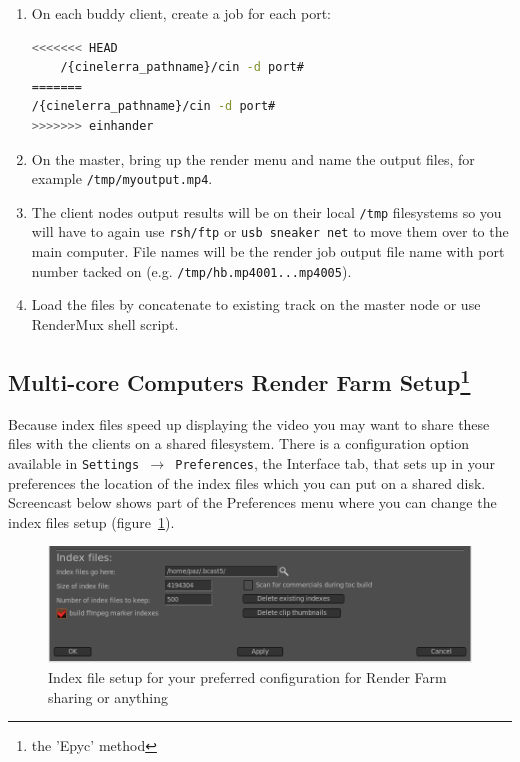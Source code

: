 \begin{enumerate}
    \item On each buddy client, create a job for each port:    
    \begin{lstlisting}[language=bash]
<<<<<<< HEAD
    /{cinelerra_pathname}/cin -d port#
=======
/{cinelerra_pathname}/cin -d port#
>>>>>>> einhander
    \end{lstlisting}
    \item On the master, bring up the render menu and name the output files, for example \texttt{/tmp/myoutput.mp4}.
    \item The client nodes output results will be on their local \texttt{/tmp} filesystems so you will have to again use
    \texttt{rsh/ftp} or \texttt{usb sneaker net} to move them over to the main computer.  File names will be the render
    job output file name with port number tacked on (e.g. \texttt{/tmp/hb.mp4001...mp4005}).
    \item Load the files by concatenate to existing track on the master node or use RenderMux shell script.
\end{enumerate}

\subsection{Multi-core Computers Render Farm Setup\protect\footnote{the 'Epyc' method}}%
\label{sub:multi_core_render_farm_setup}

Because index files speed up displaying the video you may want to share these files with the clients on a shared filesystem.  There is a configuration option available in \texttt{Settings $\rightarrow$ Preferences}, the Interface tab, that sets up in your preferences the location of the index files which you can put on a shared disk.
Screencast below shows part of the Preferences menu where you can change the index files setup (figure~\ref{fig:index}).

\begin{figure}[htpb]
    \centering
    \includegraphics[width=0.8\linewidth]{images/index.png}
    \caption{Index file setup for your preferred configuration for Render Farm sharing or anything}
    \label{fig:index}
\end{figure}

